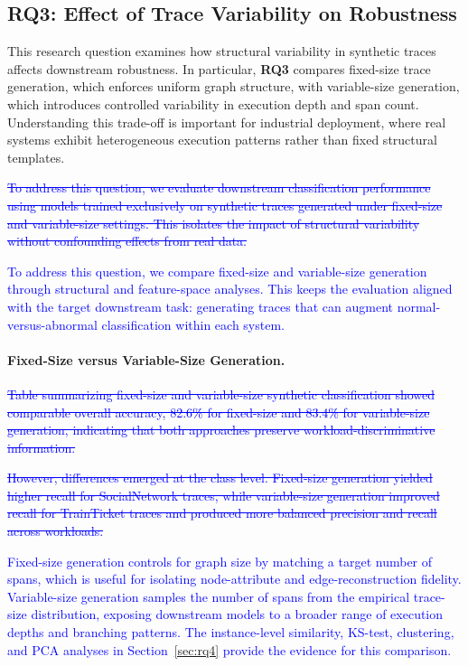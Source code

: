 \documentclass[sigconf,review]{acmart}
\begin{document}
\subsection{RQ3: Effect of Trace Variability on Robustness}
\label{sec:rq3}

This research question examines how structural variability in synthetic traces affects downstream robustness. In particular, \textbf{RQ3} compares fixed-size trace generation, which enforces uniform graph structure, with variable-size generation, which introduces controlled variability in execution depth and span count. Understanding this trade-off is important for industrial deployment, where real systems exhibit heterogeneous execution patterns rather than fixed structural templates.

\textcolor{blue}{\sout{To address this question, we evaluate downstream classification performance using models trained exclusively on synthetic traces generated under fixed-size and variable-size settings. This isolates the impact of structural variability without confounding effects from real data.}}

\textcolor{blue}{To address this question, we compare fixed-size and variable-size generation through structural and feature-space analyses. This keeps the evaluation aligned with the target downstream task: generating traces that can augment normal-versus-abnormal classification within each system.}

\paragraph{Fixed-Size versus Variable-Size Generation.}
\textcolor{blue}{\sout{Table summarizing fixed-size and variable-size synthetic classification showed comparable overall accuracy, 82.6\% for fixed-size and 83.4\% for variable-size generation, indicating that both approaches preserve workload-discriminative information.}}

\textcolor{blue}{\sout{However, differences emerged at the class level. Fixed-size generation yielded higher recall for SocialNetwork traces, while variable-size generation improved recall for TrainTicket traces and produced more balanced precision and recall across workloads.}}

\textcolor{blue}{Fixed-size generation controls for graph size by matching a target number of spans, which is useful for isolating node-attribute and edge-reconstruction fidelity. Variable-size generation samples the number of spans from the empirical trace-size distribution, exposing downstream models to a broader range of execution depths and branching patterns. The instance-level similarity, KS-test, clustering, and PCA analyses in Section~\ref{sec:rq4} provide the evidence for this comparison.}
\end{document}
